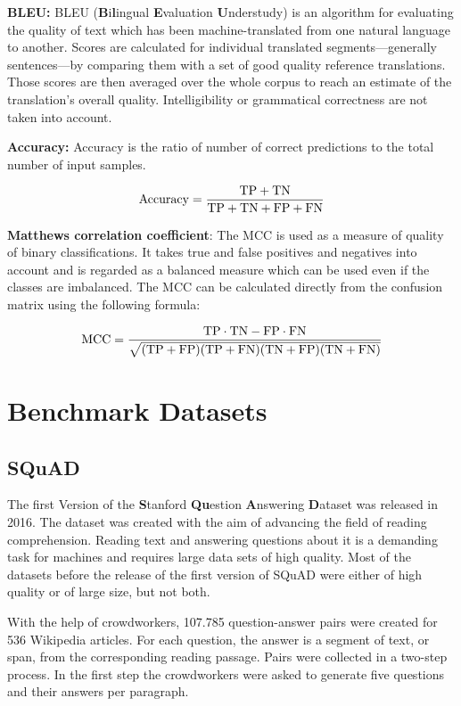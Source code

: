 \documentclass[]{krantz}
\begin{document}
\textbf{BLEU:} BLEU (\textbf{B}i\textbf{l}ingual \textbf{E}valuation \textbf{U}nderstudy) is an algorithm for evaluating the quality of text which has been machine-translated from one natural language to another. Scores are calculated for individual translated segments---generally sentences---by comparing them with a set of good quality reference translations. Those scores are then averaged over the whole corpus to reach an estimate of the translation's overall quality. Intelligibility or grammatical correctness are not taken into account. \citep{papineni2002bleu}

\textbf{Accuracy:} Accuracy is the ratio of number of correct predictions to the total number of input samples.

\[\hbox{Accuracy}=\frac{\hbox{TP}+\hbox{TN}}{\hbox{TP}+\hbox{TN}+\hbox{FP}+\hbox{FN}}\]

\textbf{Matthews correlation coefficient}: The MCC is used as a measure of quality of binary classifications. It takes true and false positives and negatives into account and is regarded as a balanced measure which can be used even if the classes are imbalanced. The MCC can be calculated directly from the confusion matrix using the following formula:

\[\hbox{MCC}=\frac{\hbox{TP}\cdot\hbox{TN}-\hbox{FP}\cdot\hbox{FN}}{\sqrt{(\hbox{TP}+\hbox{FP})(\hbox{TP}+\hbox{FN})(\hbox{TN}+\hbox{FP})(\hbox{TN}+\hbox{FN})}} \]
\citep{boughorbel2017optimal}

\hypertarget{benchmark-datasets}{%
\section{Benchmark Datasets}\label{benchmark-datasets}}

\hypertarget{squad}{%
\subsection{SQuAD}\label{squad}}

The first Version of the \textbf{S}tanford \textbf{Qu}estion \textbf{A}nswering \textbf{D}ataset was released in 2016. The dataset was created with the aim of advancing the field of reading comprehension. Reading text and answering questions about it is a demanding task for machines and requires large data sets of high quality. Most of the datasets before the release of the first version of SQuAD were either of high quality or of large size, but not both.

With the help of crowdworkers, 107.785 question-answer pairs were created for 536 Wikipedia articles. For each question, the answer is a segment of text, or span, from the corresponding reading passage.
Pairs were collected in a two-step process. In the first step the crowdworkers were asked to generate five questions and their answers per paragraph.
\end{document}

